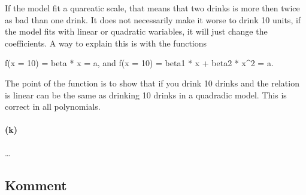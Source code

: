 \documentclass[
]{article}
\begin{document}
If the model fit a quareatic scale, that means that two drinks is more
then twice as bad than one drink. It does not necessarily make it worse
to drink 10 units, if the model fits with linear or quadratic wariables,
it will just change the coefficients. A way to explain this is with the
functions

f(x = 10) = beta * x = a, and f(x = 10) = beta1 * x + beta2 * x\^{}2 =
a.

The point of the function is to show that if you drink 10 drinks and the
relation is linear can be the same as drinking 10 drinks in a quadradic
model. This is correct in all polynomials.

\hypertarget{k}{%
\paragraph{(k)}\label{k}}

\ldots{}

\hypertarget{komment-1}{%
\subsection{Komment}\label{komment-1}}
\end{document}
